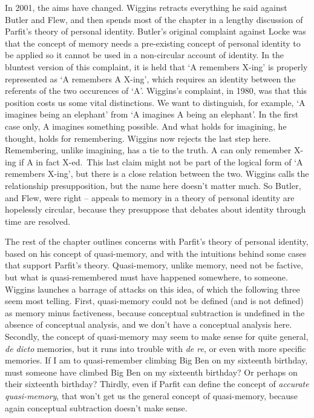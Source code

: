 \documentclass[
  11pt,
  letterpaper,
  DIV=11,
  numbers=noendperiod,
  twoside]{scrartcl}
\begin{document}
In 2001, the aims have changed. Wiggins retracts everything he said
against Butler and Flew, and then spends most of the chapter in a
lengthy discussion of Parfit's theory of personal identity. Butler's
original complaint against Locke was that the concept of memory needs a
pre-existing concept of personal identity to be applied so it cannot be
used in a non-circular account of identity. In the bluntest version of
this complaint, it is held that `A remembers X-ing' is properly
represented as `A remembers A X-ing', which requires an identity between
the referents of the two occurences of `A'. Wiggins's complaint, in
1980, was that this position costs us some vital distinctions. We want
to distinguish, for example, `A imagines being an elephant' from `A
imagines A being an elephant'. In the first case only, A imagines
something possible. And what holds for imagining, he thought, holds for
remembering. Wiggins now rejects the last step here. Remembering, unlike
imagining, has a tie to the truth. A can only remember X-ing if A in
fact X-ed.~This last claim might not be part of the logical form of `A
remembers X-ing', but there is a close relation between the two. Wiggins
calls the relationship presupposition, but the name here doesn't matter
much. So Butler, and Flew, were right -- appeals to memory in a theory
of personal identity are hopelessly circular, because they presuppose
that debates about identity through time are resolved.

The rest of the chapter outlines concerns with Parfit's theory of
personal identity, based on his concept of quasi-memory, and with the
intuitions behind some cases that support Parfit's theory. Quasi-memory,
unlike memory, need not be factive, but what is quasi-remembered must
have happened somewhere, to someone. Wiggins launches a barrage of
attacks on this idea, of which the following three seem most telling.
First, quasi-memory could not be defined (and is not defined) as memory
minus factiveness, because conceptual subtraction is undefined in the
absence of conceptual analysis, and we don't have a conceptual analysis
here. Secondly, the concept of quasi-memory may seem to make sense for
quite general, \emph{de dicto} memories, but it runs into trouble with
\emph{de re}, or even with more specific memories. If I am to
quasi-remember climbing Big Ben on my sixteenth birthday, must someone
have climbed Big Ben on my sixteenth birthday? Or perhaps on their
sixteenth birthday? Thirdly, even if Parfit can define the concept of
\emph{accurate quasi-memory}, that won't get us the general concept of
quasi-memory, because again conceptual subtraction doesn't make sense.
\end{document}
